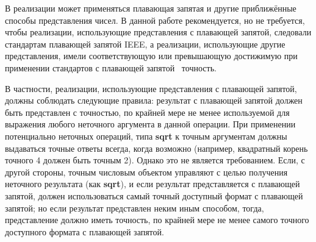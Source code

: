 В реализации может применяться плавающая запятая и другие приближённые способы представления
 чисел. В данной работе рекомендуется, но не требуется, чтобы реализации,
использующие представления с плавающей запятой, следовали стандартам плавающей запятой IEEE, а
реализации, использующие другие представления, имели соответствующую или превышающую достижимую
при применении стандартов с плавающей запятой~\cite{IEEE} точность.

В частности, реализации, использующие представления с плавающей запятой, должны соблюдать
следующие правила: результат с плавающей запятой должен быть представлен с точностью, по крайней
мере не менее используемой для выражения любого неточного аргумента в данной операции. При
применении потенциально неточных операций, типа {\cf\bfseries sqrt} к точным аргументам должны
выдаваться точные ответы всегда, когда возможно (например, квадратный корень точного 4 должен
быть точным 2). Однако это не является требованием. Если, с другой стороны, точным числовым
объектом управляют с целью получения неточного результата (как {\cf\bfseries sqrt}), и если
результат представляется с плавающей запятой, должен использоваться самый точный доступный
формат с плавающей запятой; но если результат представлен неким иным способом, тогда,
представление должно иметь точность, по крайней мере не менее самого точного доступного формата с
плавающей запятой.

